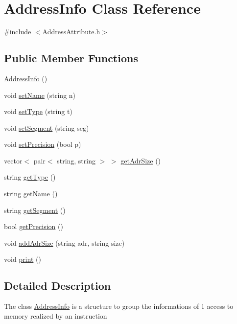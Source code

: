 \hypertarget{classAddressInfo}{}\section{Address\+Info Class Reference}
\label{classAddressInfo}


{\ttfamily \#include $<$Address\+Attribute.\+h$>$}

\subsection*{Public Member Functions}
\begin{DoxyCompactItemize}
\item 
\hyperlink{classAddressInfo_a1d82e681b86d769de4325b99163ed640}{Address\+Info} ()
\item 
void \hyperlink{classAddressInfo_a37271fcb2207dc8b7f816907760fc721}{set\+Name} (string n)
\item 
void \hyperlink{classAddressInfo_a024ac80e1b8a35625cb77d6a4c8e6b0e}{set\+Type} (string t)
\item 
void \hyperlink{classAddressInfo_a9e530ba6525d74f46da29705a032e84c}{set\+Segment} (string seg)
\item 
void \hyperlink{classAddressInfo_a5c8bf00c9f0816ef0dc9794317434418}{set\+Precision} (bool p)
\item 
vector$<$ pair$<$ string, string $>$ $>$ \hyperlink{classAddressInfo_a459c495a6d820e9312d733a816a3ba79}{get\+Adr\+Size} ()
\item 
string \hyperlink{classAddressInfo_ad4decf39436c2c5f5c7725dd72d1c4e9}{get\+Type} ()
\item 
string \hyperlink{classAddressInfo_abe571cf9594ec7309baec30df6b5fc9a}{get\+Name} ()
\item 
string \hyperlink{classAddressInfo_a672a6460879dc1f63eb1fd8ee6d18b55}{get\+Segment} ()
\item 
bool \hyperlink{classAddressInfo_ac833d1421bef4e4f936a7bad9686c795}{get\+Precision} ()
\item 
void \hyperlink{classAddressInfo_a90a057789302f68c43f07ffaafb53af1}{add\+Adr\+Size} (string adr, string size)
\item 
void \hyperlink{classAddressInfo_a2c82626af62f839742cfa6797f257e6f}{print} ()
\end{DoxyCompactItemize}


\subsection{Detailed Description}
The class \hyperlink{classAddressInfo}{Address\+Info} is a structure to group the informations of 1 access to memory realized by an instruction 

